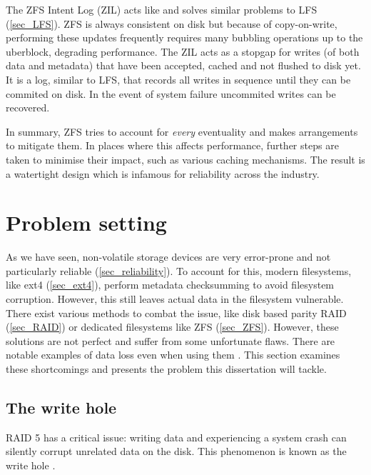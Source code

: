             The ZFS Intent Log (ZIL) acts like and solves similar problems to
            LFS (\ref{sec_LFS}). ZFS is always consistent on disk but because
            of copy-on-write, performing these updates frequently requires many
            bubbling operations up to the uberblock, degrading performance. The
            ZIL acts as a stopgap for writes (of both data and metadata) that
            have been accepted, cached and not flushed to disk yet. It is a
            log, similar to LFS, that records all writes in sequence until they
            can be commited on disk. In the event of system failure uncommited
            writes can be recovered.

            In summary, ZFS tries to account for \textit{every} eventuality and
            makes arrangements to mitigate them. In places where this affects
            performance, further steps are taken to minimise their impact, such
            as various caching mechanisms. The result is a watertight design
            which is infamous for reliability across the industry.

\chapter{Problem setting}

    As we have seen, non-volatile storage devices are very error-prone and not
    particularly reliable (\ref{sec_reliability}). To account for this, modern
    filesystems, like ext4 (\ref{sec_ext4}), perform metadata checksumming to
    avoid filesystem corruption. However, this still leaves actual data in the
    filesystem vulnerable. There exist various methods to combat the issue,
    like disk based parity RAID (\ref{sec_RAID}) or dedicated filesystems like
    ZFS (\ref{sec_ZFS}). However, these solutions are not perfect and suffer
    from some unfortunate flaws. There are notable examples of data loss even
    when using them \cite{LTT_data_loss}. This section examines these
    shortcomings and presents the problem this dissertation will tackle.

    \section{The write hole}
        \label{sec_RAID_problems}

        RAID 5 has a critical issue: writing data and experiencing a system
        crash can silently corrupt unrelated data on the disk. This phenomenon
        is known as the write hole \cite{LWN_md_journal}.


